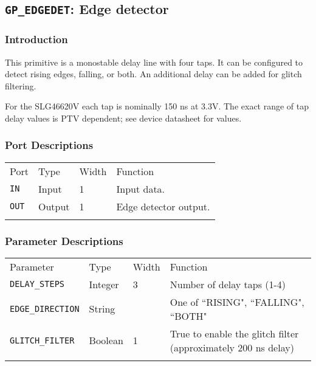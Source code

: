 \documentclass[11pt]{article}
\newcommand{\tokenstyle}[1]{\texttt{#1}}
\newcommand{\whenstyle}[1]{{\fontseries{sb}\selectfont#1}}
\newcommand{\thinhline}{\Xhline{1\arrayrulewidth}}
\newcommand{\thickhline}{\Xhline{2.5\arrayrulewidth}}
\begin{document}

\pagebreak
\subsection{\tokenstyle{GP\_EDGEDET}: Edge detector}
\label{gp-edgedet}

\subsubsection{Introduction}

This primitive is a monostable delay line with four taps. It can be configured to detect rising edges, falling, or
both. An additional delay can be added for glitch filtering.

For the SLG46620V each tap is nominally 150 ns at 3.3V. The exact range of tap delay values is PTV dependent; see
device datasheet for values.

\subsubsection{Port Descriptions}

\begin{tabularx}{\textwidth}{lllX}
\thinhline
\whenstyle{Port} & \whenstyle{Type} & \whenstyle{Width} & \whenstyle{Function} \\
\thickhline
\tokenstyle{IN} & Input & 1 & Input data. \\
\thinhline
\tokenstyle{OUT} & Output & 1 & Edge detector output. \\
\thinhline
\end{tabularx}

\subsubsection{Parameter Descriptions}

\begin{tabularx}{\textwidth}{lllX}
\thinhline
\whenstyle{Parameter} & \whenstyle{Type} & \whenstyle{Width} & \whenstyle{Function} \\
\thickhline
\tokenstyle{DELAY\_STEPS} & Integer & 3 & Number of delay taps (1-4) \\
\thinhline
\tokenstyle{EDGE\_DIRECTION} & String & & One of ``RISING", ``FALLING", ``BOTH" \\
\thinhline
\tokenstyle{GLITCH\_FILTER} & Boolean & 1 & True to enable the glitch filter (approximately 200 ns delay) \\
\thinhline
\end{tabularx}
\end{document}
